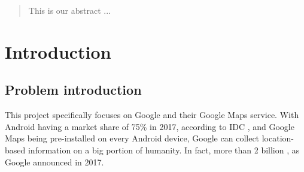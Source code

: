 \documentclass[12p]{article}
\begin{document}
		
		\begin{abstract}
			\thispagestyle{plain} %
			
			\noindent This is our abstract
			\newline \newline
			\noindent ...
			
		\end{abstract}
		
		\newpage
		
		
		\tableofcontents %
		\thispagestyle{plain} %
		
		\newpage %
		
		
		\section{Introduction}
		
		\subsection{Problem introduction} \label{ProblemIntroduction}
		
		This project specifically focuses on Google and their Google Maps service. With Android having a market share of 75\% in 2017, according to IDC \cite{SmartphoneOSMarketShare}, and Google Maps being pre-installed on every Android device, Google can collect location-based information on a big portion of humanity. In fact, more than 2 billion \cite{AndroidMonthlyActiveUsers}, as Google announced in 2017.
		
\end{document}
